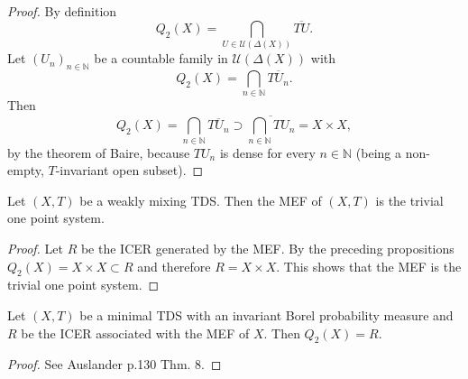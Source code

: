   \begin{proof}
    By definition
    \begin{equation*}
      Q_2 (X) = \bigcap_{U \in \mathcal{U}(\Delta (X))} \overline{TU}.
    \end{equation*}
    Let $(U_n)_{n \in \mathbb{N}}$ be a countable family in $\mathcal{U}(\Delta (X))$ with 
    \begin{equation*}
      Q_2 (X) =\bigcap_{n \in \mathbb{N}} \overline{TU_n}.
    \end{equation*}
    Then
\begin{equation*}
      Q_2 (X) =\bigcap_{n \in \mathbb{N}} \overline{TU_n} \supset 
  \overline{\bigcap_{n \in \mathbb{N}} TU_n } = X \times X,
    \end{equation*}
    by the theorem of Baire, because $TU_n$ is dense for every $n \in \mathbb{N}$ (being a non-empty, $T$-invariant open subset).
  \end{proof}
  \begin{corollary}
    Let $(X,T)$ be a weakly mixing TDS. Then the MEF of $(X,T)$ is the trivial one point system.
  \end{corollary}
  \begin{proof}
    Let $R$ be the ICER generated by the MEF.
    By the preceding propositions $Q_2 (X) = X\times X \subset R$ and therefore $R = X \times X$.
    This shows that the MEF is the trivial one point system.
  \end{proof}
\begin{theorem}
  Let $(X, T)$ be a minimal TDS with an invariant Borel probability measure
  and $R$ be the ICER associated with the MEF of $X$.
  Then $Q_2(X) = R$.
\end{theorem}

\begin{proof}
  See Auslander p.130 Thm. 8.
\end{proof}


